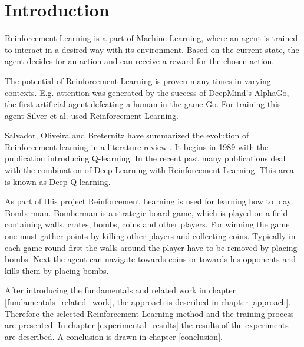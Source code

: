 \section{Introduction}

Reinforcement Learning is a part of Machine Learning, where an agent is trained to interact in a desired way with its environment. Based on the current state, the agent decides for an action and can receive a reward for the chosen action. \cite{Salvador2020}

The potential of Reinforcement Learning is proven many times in varying contexts. E.g. attention was generated by the success of DeepMind's AlphaGo, the first artificial agent defeating a human in the game Go. For training this agent Silver et al. used Reinforcement Learning. \cite{Silver1140}

Salvador, Oliveira and Breternitz have summarized the evolution of Rein\-force\-ment learning in a literature review \cite{Salvador2020}. It begins in 1989 with the publication introducing Q-learning. In the recent past many publications deal with the combination of Deep Learning with Reinforcement Learning. This area is known as Deep Q-learning.

As part of this project Reinforcement Learning is used for learning how to play Bomberman. Bomberman is a strategic board game, which is played on a field containing walls, crates, bombs, coins and other players. For winning the game one must gather points by killing other players and collecting coins. Typically in each game round first the walls around the player have to be removed by placing bombs. Next the agent can navigate towards coins or towards his opponents and kills them by placing bombs. \cite{Kormelink2018}

After introducing the fundamentals and related work in chapter \ref{fundamentals_related_work}, the approach is described in chapter \ref{approach}. Therefore the selected Reinforcement Learning method and the training process are presented. In chapter \ref{experimental_results} the results of the experiments are described. A conclusion is drawn in chapter \ref{conclusion}.

\newpage
